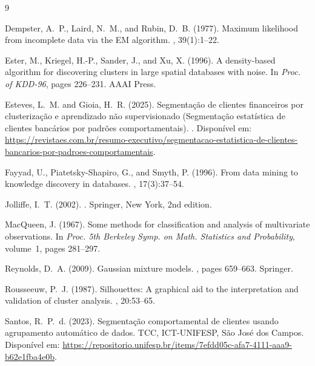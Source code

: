 \documentclass[10pt,twocolumn]{article}
\begin{document}
{\footnotesize
\begin{thebibliography}{9}
\setlength{\itemsep}{1pt}

Dempster, A.~P., Laird, N.~M., and Rubin, D.~B. (1977).
\newblock Maximum likelihood from incomplete data via the {EM} algorithm.
, 39(1):1--22.

Ester, M., Kriegel, H.-P., Sander, J., and Xu, X. (1996).
\newblock A density-based algorithm for discovering clusters in large spatial databases with noise.
\newblock In {\em Proc. of KDD-96}, pages 226--231. AAAI Press.

Esteves, L.~M. and Gioia, H.~R. (2025).
\newblock Segmentação de clientes financeiros por clusterização e aprendizado não supervisionado (Segmentação estatística de clientes bancários por padrões comportamentais).
. Disponível em: \url{https://revistaes.com.br/resumo-executivo/segmentacao-estatistica-de-clientes-bancarios-por-padroes-comportamentais}.

Fayyad, U., Piatetsky-Shapiro, G., and Smyth, P. (1996).
\newblock From data mining to knowledge discovery in databases.
, 17(3):37--54.

Jolliffe, I.~T. (2002).
.
\newblock Springer, New York, 2nd edition.

MacQueen, J. (1967).
\newblock Some methods for classification and analysis of multivariate observations.
\newblock In {\em Proc. 5th Berkeley Symp. on Math. Statistics and Probability}, volume~1, pages 281--297.

Reynolds, D.~A. (2009).
\newblock Gaussian mixture models.
, pages 659--663. Springer.

Rousseeuw, P.~J. (1987).
\newblock Silhouettes: A graphical aid to the interpretation and validation of cluster analysis.
, 20:53--65.

Santos, R.~P.~d. (2023).
\newblock Segmentação comportamental de clientes usando agrupamento automático de dados.
\newblock TCC, ICT-UNIFESP, São José dos Campos. Disponível em: \url{https://repositorio.unifesp.br/items/7efdd05c-afa7-4111-aaa9-b62e1fba4e0b}.

\end{thebibliography}
}
\end{document}
